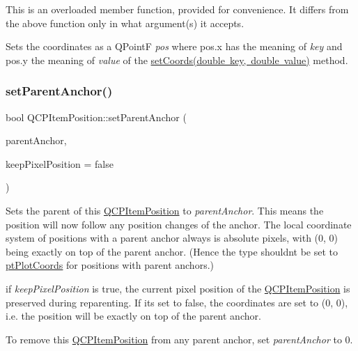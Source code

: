 This is an overloaded member function, provided for convenience. It differs from the above function only in what argument(s) it accepts.

Sets the coordinates as a Q\+PointF {\itshape pos} where pos.\+x has the meaning of {\itshape key} and pos.\+y the meaning of {\itshape value} of the \mbox{\hyperlink{class_q_c_p_item_position_aa988ba4e87ab684c9021017dcaba945f}{set\+Coords(double key, double value)}} method. \mbox{\label{class_q_c_p_item_position_ac094d67a95d2dceafa0d50b9db3a7e51}} 
\subsubsection{\texorpdfstring{setParentAnchor()}{setParentAnchor()}}
{\footnotesize\ttfamily bool Q\+C\+P\+Item\+Position\+::set\+Parent\+Anchor (\begin{DoxyParamCaption}\item[{\mbox{\hyperlink{class_q_c_p_item_anchor}{Q\+C\+P\+Item\+Anchor}} $\ast$}]{parent\+Anchor,  }\item[{bool}]{keep\+Pixel\+Position = {\ttfamily false} }\end{DoxyParamCaption})}

Sets the parent of this \mbox{\hyperlink{class_q_c_p_item_position}{Q\+C\+P\+Item\+Position}} to {\itshape parent\+Anchor}. This means the position will now follow any position changes of the anchor. The local coordinate system of positions with a parent anchor always is absolute pixels, with (0, 0) being exactly on top of the parent anchor. (Hence the type shouldn\textquotesingle{}t be set to \mbox{\hyperlink{class_q_c_p_item_position_aad9936c22bf43e3d358552f6e86dbdc8ad5ffb8dc99ad73263f7010c77342294c}{pt\+Plot\+Coords}} for positions with parent anchors.)

if {\itshape keep\+Pixel\+Position} is true, the current pixel position of the \mbox{\hyperlink{class_q_c_p_item_position}{Q\+C\+P\+Item\+Position}} is preserved during reparenting. If it\textquotesingle{}s set to false, the coordinates are set to (0, 0), i.\+e. the position will be exactly on top of the parent anchor.

To remove this \mbox{\hyperlink{class_q_c_p_item_position}{Q\+C\+P\+Item\+Position}} from any parent anchor, set {\itshape parent\+Anchor} to 0.


